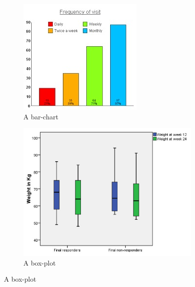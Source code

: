 \documentclass[12pt, a4paper,oneside]{report}
\begin{document}
\begin{figure}[!htbp]
	\begin{subfigure}[b]{0.5\textwidth}
		\includegraphics[width=\textwidth]{rand1}
		\caption{A bar-chart}
		\label{fig:rand1}
	\end{subfigure}
	\begin{subfigure}[b]{0.5\textwidth}
		\includegraphics[width=\textwidth]{rand2}
		\caption{A box-plot}
		\label{fig:rand2}
	\end{subfigure}


\end{figure}
\end{document}
